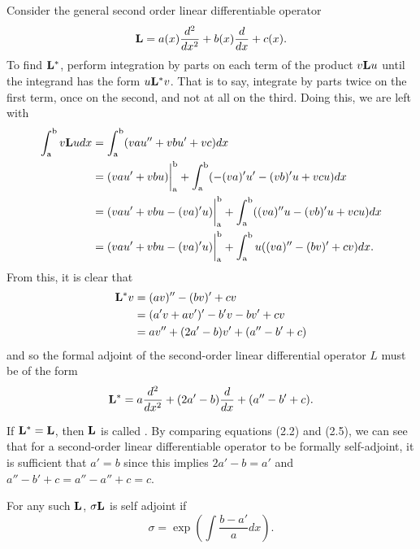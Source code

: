 \begin{example}\label{ex:selfAdjoint}
	Consider the general second order linear differentiable operator
	\begin{equation}
		\mathrm{\bf{L}}= a(x) \frac{d^2}{dx^2} + b(x)\frac{d}{dx} + c(x).
	\end{equation}
	To find \(\mathrm{\bf{L^*}}  \), perform integration by parts on each term of the product \(v\mathrm{\bf{L}} u\) until the integrand has the form \(u \mathrm{\bf{L}}^* v\). That is to say, integrate by parts twice on the first term, once on the second, and not at all on the third. Doing this, we are left with
	\begin{equation}
		\begin{split}
			\int_\mathrm{a}^\mathrm{b} v\mathrm{\bf{L}} u dx &= \int_\mathrm{a}^\mathrm{b} (vau''+ vbu' + vc)dx\\
			&=(vau'+vbu)\biggr\rvert_\mathrm{a}^\mathrm{b} + \int_\mathrm{a}^\mathrm{b} (-(va)'u'-(vb)'u+vcu)dx\\
			&=(vau'+vbu-(va)'u)\biggr\rvert_\mathrm{a}^\mathrm{b} + \int_\mathrm{a}^\mathrm{b} ((va)''u-(vb)'u+vcu)dx\\
			&=(vau'+vbu-(va)'u)\biggr\rvert_\mathrm{a}^\mathrm{b} + \int_\mathrm{a}^\mathrm{b} u((va)''-(bv)'+cv)dx.
		\end{split}
	\end{equation}
	From this, it is clear that 
	\begin{equation}\label{eq:2OAdjoint}
		\begin{split}
			\mathrm{\bf{L^*}} v &= (av)''-(bv)'+cv\\
			     &= (a'v+av')'-b'v-bv'+cv\\
			     &= av''+(2a'-b)v'+(a''-b'+c)
		\end{split}
	\end{equation}
	and so the formal adjoint of the second-order linear differential operator \(L\) must be of the form
	\begin{equation}
		\begin{split}
			\mathrm{\bf{L^*}} =a\frac{d^2}{dx^2} + (2a'-b)\frac{d}{dx}+(a''-b'+c).
		\end{split}
	\end{equation}
	
	
	If \(\mathrm{\bf{L^*}}  = \mathrm{\bf{L}}\), then \( \mathrm{\bf{L}}\) is called . By comparing equations (2.2) and (2.5), we can see that for a second-order linear differentiable operator to be formally self-adjoint, it is sufficient that \(a'=b\) since this implies \(2a'-b=a'\) and \(a''-b'+c=a''-a''+c=c\).
\end{example}

\begin{theorem}
	For any such \(\mathrm{\bf{L}}\), \(\sigma\mathrm{\bf{L}}\) is self adjoint if
		\begin{equation}
			\sigma = \exp\left({\int \frac{b-a'}{a}dx}\right).
		\end{equation}
\end{theorem}

